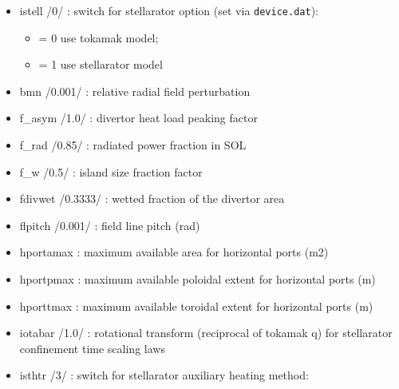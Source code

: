 \documentclass[
]{article}
\providecommand{\tightlist}{%
  \setlength{\itemsep}{0pt}\setlength{\parskip}{0pt}}
\begin{document}
\begin{itemize}
  \begin{itemize}
  \tightlist
  \item
    istell /0/ : switch for stellarator option (set via
    \texttt{device.dat}):

    \begin{itemize}
    \tightlist
    \item
      = 0 use tokamak model;
    \item
      = 1 use stellarator model
    \end{itemize}
  \item
    bmn /0.001/ : relative radial field perturbation
  \item
    f\_asym /1.0/ : divertor heat load peaking factor
  \item
    f\_rad /0.85/ : radiated power fraction in SOL
  \item
    f\_w /0.5/ : island size fraction factor
  \item
    fdivwet /0.3333/ : wetted fraction of the divertor area
  \item
    flpitch /0.001/ : field line pitch (rad)
  \item
    hportamax : maximum available area for horizontal ports (m2)
  \item
    hportpmax : maximum available poloidal extent for horizontal ports
    (m)
  \item
    hporttmax : maximum available toroidal extent for horizontal ports
    (m)
  \item
    iotabar /1.0/ : rotational transform (reciprocal of tokamak q) for
    stellarator confinement time scaling laws
  \item
    isthtr /3/ : switch for stellarator auxiliary heating method:


\end{itemize}
\end{itemize}
\end{document}
